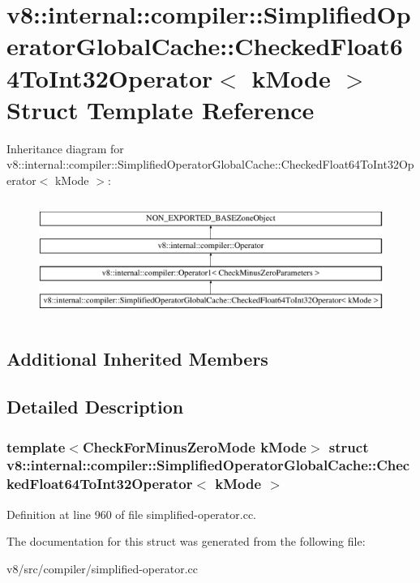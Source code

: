\hypertarget{structv8_1_1internal_1_1compiler_1_1SimplifiedOperatorGlobalCache_1_1CheckedFloat64ToInt32Operator}{}\section{v8\+:\+:internal\+:\+:compiler\+:\+:Simplified\+Operator\+Global\+Cache\+:\+:Checked\+Float64\+To\+Int32\+Operator$<$ k\+Mode $>$ Struct Template Reference}
\label{structv8_1_1internal_1_1compiler_1_1SimplifiedOperatorGlobalCache_1_1CheckedFloat64ToInt32Operator}
Inheritance diagram for v8\+:\+:internal\+:\+:compiler\+:\+:Simplified\+Operator\+Global\+Cache\+:\+:Checked\+Float64\+To\+Int32\+Operator$<$ k\+Mode $>$\+:\begin{figure}[H]
\begin{center}
\leavevmode
\includegraphics[height=3.916084cm]{structv8_1_1internal_1_1compiler_1_1SimplifiedOperatorGlobalCache_1_1CheckedFloat64ToInt32Operator}
\end{center}
\end{figure}
\subsection*{Additional Inherited Members}


\subsection{Detailed Description}
\subsubsection*{template$<$Check\+For\+Minus\+Zero\+Mode k\+Mode$>$\newline
struct v8\+::internal\+::compiler\+::\+Simplified\+Operator\+Global\+Cache\+::\+Checked\+Float64\+To\+Int32\+Operator$<$ k\+Mode $>$}



Definition at line 960 of file simplified-\/operator.\+cc.



The documentation for this struct was generated from the following file\+:\begin{DoxyCompactItemize}
\item 
v8/src/compiler/simplified-\/operator.\+cc\end{DoxyCompactItemize}
